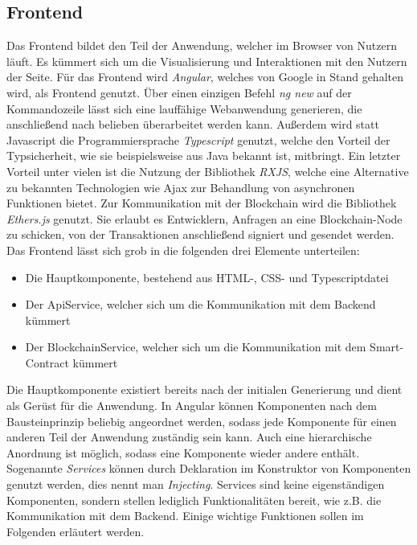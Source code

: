 \subsection{Frontend}
Das Frontend bildet den Teil der Anwendung, welcher im Browser von Nutzern läuft. Es kümmert sich um die Visualisierung und Interaktionen mit den Nutzern der Seite.
Für das Frontend wird \emph{Angular}, welches von Google in Stand gehalten wird, als Frontend genutzt. Über einen einzigen Befehl \emph{ng new} auf der Kommandozeile lässt sich eine lauffähige Webanwendung generieren, die anschließend nach belieben überarbeitet werden kann. Außerdem wird statt Javascript die Programmiersprache \emph{Typescript} genutzt, welche den Vorteil der Typsicherheit, wie sie beispielsweise aus Java bekannt ist, mitbringt. Ein letzter Vorteil unter vielen ist die Nutzung der Bibliothek \emph{RXJS}, welche eine Alternative zu bekannten Technologien wie Ajax zur Behandlung von asynchronen Funktionen bietet.
Zur Kommunikation mit der Blockchain wird die Bibliothek \emph{Ethers.js} genutzt. Sie erlaubt es Entwicklern, Anfragen an eine Blockchain-Node zu schicken, von der Transaktionen anschließend signiert und gesendet werden. Das Frontend lässt sich grob in die folgenden drei Elemente unterteilen:
\begin{itemize}
	\item Die Hauptkomponente, bestehend aus HTML-, CSS- und Typescriptdatei
	\item Der ApiService, welcher sich um die Kommunikation mit dem Backend kümmert
	\item Der BlockchainService, welcher sich um die Kommunikation mit dem Smart-Contract kümmert
\end{itemize}
Die Hauptkomponente existiert bereits nach der initialen Generierung und dient als Gerüst für die Anwendung. In Angular können Komponenten nach dem Bausteinprinzip beliebig angeordnet werden, sodass jede Komponente für einen anderen Teil der Anwendung zuständig sein kann. Auch eine hierarchische Anordnung ist möglich, sodass eine Komponente wieder andere enthält. Sogenannte \emph{Services} können durch Deklaration im Konstruktor von Komponenten genutzt werden, dies nennt man \emph{Injecting}. Services sind keine eigenständigen Komponenten, sondern stellen lediglich Funktionalitäten bereit, wie z.B. die Kommunikation mit dem Backend. Einige wichtige Funktionen sollen im Folgenden erläutert werden.
